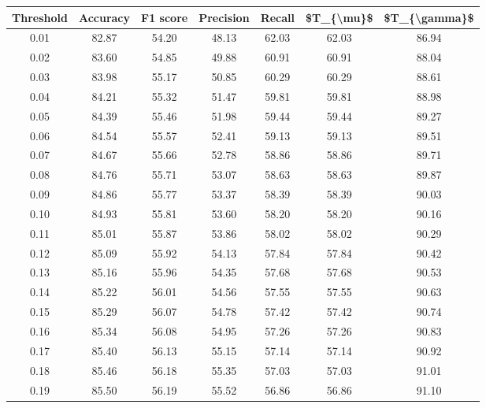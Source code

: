 \begin{tabular}{|c|c|c|c|c|c|c|}
\hline
 Threshold &  Accuracy &  F1 score &  Precision &  Recall &  \$T\_\{\textbackslash mu\}\$ &  \$T\_\{\textbackslash gamma\}\$ \\
\hline
      0.01 &     82.87 &     54.20 &      48.13 &   62.03 &      62.03 &         86.94 \\
      0.02 &     83.60 &     54.85 &      49.88 &   60.91 &      60.91 &         88.04 \\
      0.03 &     83.98 &     55.17 &      50.85 &   60.29 &      60.29 &         88.61 \\
      0.04 &     84.21 &     55.32 &      51.47 &   59.81 &      59.81 &         88.98 \\
      0.05 &     84.39 &     55.46 &      51.98 &   59.44 &      59.44 &         89.27 \\
      0.06 &     84.54 &     55.57 &      52.41 &   59.13 &      59.13 &         89.51 \\
      0.07 &     84.67 &     55.66 &      52.78 &   58.86 &      58.86 &         89.71 \\
      0.08 &     84.76 &     55.71 &      53.07 &   58.63 &      58.63 &         89.87 \\
      0.09 &     84.86 &     55.77 &      53.37 &   58.39 &      58.39 &         90.03 \\
      0.10 &     84.93 &     55.81 &      53.60 &   58.20 &      58.20 &         90.16 \\
      0.11 &     85.01 &     55.87 &      53.86 &   58.02 &      58.02 &         90.29 \\
      0.12 &     85.09 &     55.92 &      54.13 &   57.84 &      57.84 &         90.42 \\
      0.13 &     85.16 &     55.96 &      54.35 &   57.68 &      57.68 &         90.53 \\
      0.14 &     85.22 &     56.01 &      54.56 &   57.55 &      57.55 &         90.63 \\
      0.15 &     85.29 &     56.07 &      54.78 &   57.42 &      57.42 &         90.74 \\
      0.16 &     85.34 &     56.08 &      54.95 &   57.26 &      57.26 &         90.83 \\
      0.17 &     85.40 &     56.13 &      55.15 &   57.14 &      57.14 &         90.92 \\
      0.18 &     85.46 &     56.18 &      55.35 &   57.03 &      57.03 &         91.01 \\
      0.19 &     85.50 &     56.19 &      55.52 &   56.86 &      56.86 &         91.10 \\

\end{tabular}

